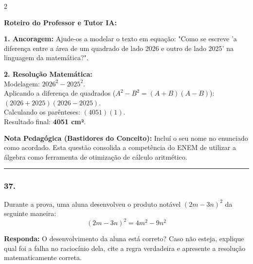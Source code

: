 \begin{multicols*}{2}
\ifgabarito
    \begin{tcolorbox}[colback=CorTitUm!5, colframe=CorTitUm, boxrule=1pt, arc=4pt, left=6pt, right=6pt, top=6pt, bottom=6pt]
    \small\textbf{\textcolor{CorTitUm}{Roteiro do Professor e Tutor IA:}}\par\vspace{0.1cm}
    \color{CinzaEscuro}
    \textbf{1. Ancoragem:} Ajude-os a modelar o texto em equação: "Como se escreve 'a diferença entre a área de um quadrado de lado 2026 e outro de lado 2025' na linguagem da matemática?".\par\vspace{0.1cm}
    \textbf{2. Resolução Matemática:}\\
    Modelagem: $2026^2 - 2025^2$.\\
    Aplicando a diferença de quadrados ($A^2 - B^2 = (A+B)(A-B)$):\\
    $(2026 + 2025)(2026 - 2025)$.\\
    Calculando os parênteses: $(4051)(1)$.\\
    Resultado final: \textbf{4051 cm²}.
    \end{tcolorbox}
    \vspace{0.15cm}
    
    \begin{boxexplicacao}
    \textbf{Nota Pedagógica (Bastidores do Conceito):} Incluí o seu nome no enunciado como acordado. Esta questão consolida a competência do ENEM de utilizar a álgebra como ferramenta de otimização de cálculo aritmético.
    \end{boxexplicacao}
\fi

\par\vspace{\espacoQuestao}

\noindent\textcolor{CorLinha}{\rule{\linewidth}{0.5pt}} 
\par\vspace{\espacoPreQuestao}
\subsubsection*{37.} 
\begin{enunciadoLiteral}
Durante a prova, uma aluna desenvolveu o produto notável $(2m - 3n)^2$ da seguinte maneira:
$$ (2m - 3n)^2 = 4m^2 - 9n^2 $$

\begin{boxresponda}
\textbf{Responda:} O desenvolvimento da aluna está correto? Caso não esteja, explique qual foi a falha no raciocínio dela, cite a regra verdadeira e apresente a resolução matematicamente correta.
\end{boxresponda}
\end{enunciadoLiteral}


\end{multicols*}
